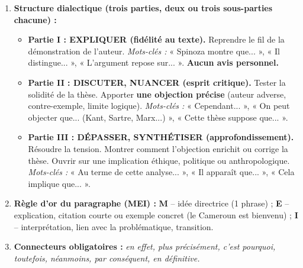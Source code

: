 \documentclass[11pt]{article}
\begin{document}
\begin{methode}
\begin{enumerate}
    \item \textbf{Structure dialectique (trois parties, deux ou trois sous-parties chacune) :}
    \begin{itemize}
        \item \textbf{Partie I : EXPLIQUER (fidélité au texte).} Reprendre le fil de la démonstration de l'auteur. \emph{Mots-clés :} « Spinoza montre que... », « Il distingue... », « L'argument repose sur... ». \textbf{Aucun avis personnel.}
        \item \textbf{Partie II : DISCUTER, NUANCER (esprit critique).} Tester la solidité de la thèse. Apporter \textbf{une objection précise} (auteur adverse, contre-exemple, limite logique). \emph{Mots-clés :} « Cependant... », « On peut objecter que... (Kant, Sartre, Marx...) », « Cette thèse suppose que... ».
        \item \textbf{Partie III : DÉPASSER, SYNTHÉTISER (approfondissement).} Résoudre la tension. Montrer comment l'objection enrichit ou corrige la thèse. Ouvrir sur une implication éthique, politique ou anthropologique. \emph{Mots-clés :} « Au terme de cette analyse... », « Il apparaît que... », « Cela implique que... ».
    \end{itemize}
    \item \textbf{Règle d'or du paragraphe (MEI) :} \textbf{M} -- idée directrice (1 phrase) ; \textbf{E} -- explication, citation courte ou exemple concret (le Cameroun est bienvenu) ; \textbf{I} -- interprétation, lien avec la problématique, transition.
    \item \textbf{Connecteurs obligatoires :} \emph{en effet, plus précisément, c'est pourquoi, toutefois, néanmoins, par conséquent, en définitive.}
\end{enumerate}
\end{methode}
\end{document}
